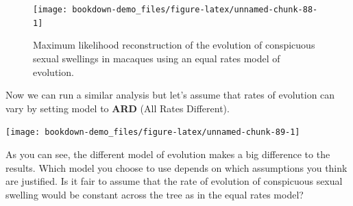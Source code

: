 \documentclass[
]{book}
\newenvironment{Shaded}{\begin{snugshade}}{\end{snugshade}}
\newcommand{\DataTypeTok}[1]{\textcolor[rgb]{0.13,0.29,0.53}{#1}}
\newcommand{\DecValTok}[1]{\textcolor[rgb]{0.00,0.00,0.81}{#1}}
\newcommand{\FloatTok}[1]{\textcolor[rgb]{0.00,0.00,0.81}{#1}}
\newcommand{\KeywordTok}[1]{\textcolor[rgb]{0.13,0.29,0.53}{\textbf{#1}}}
\newcommand{\NormalTok}[1]{#1}
\newcommand{\OperatorTok}[1]{\textcolor[rgb]{0.81,0.36,0.00}{\textbf{#1}}}
\newcommand{\OtherTok}[1]{\textcolor[rgb]{0.56,0.35,0.01}{#1}}
\newcommand{\StringTok}[1]{\textcolor[rgb]{0.31,0.60,0.02}{#1}}
\begin{document}
\begin{figure}[H]

{\centering \texttt{[image: bookdown-demo\_files/figure-latex/unnamed-chunk-88-1]} 

}

\caption{Maximum likelihood reconstruction of the evolution of conspicuous sexual swellings in macaques using an equal rates model of evolution.}\label{fig:unnamed-chunk-88}
\end{figure}

Now we can run a similar analysis but let's assume that rates of evolution can vary by setting model to \textbf{ARD} (All Rates Different).

\begin{Shaded}
\end{Shaded}

\begin{center}\texttt{[image: bookdown-demo\_files/figure-latex/unnamed-chunk-89-1]} \end{center}

As you can see, the different model of evolution makes a big difference to the results. Which model you choose to use depends on which assumptions you think are justified. Is it fair to assume that the rate of evolution of conspicuous sexual swelling would be constant across the tree as in the equal rates model?
\end{document}
